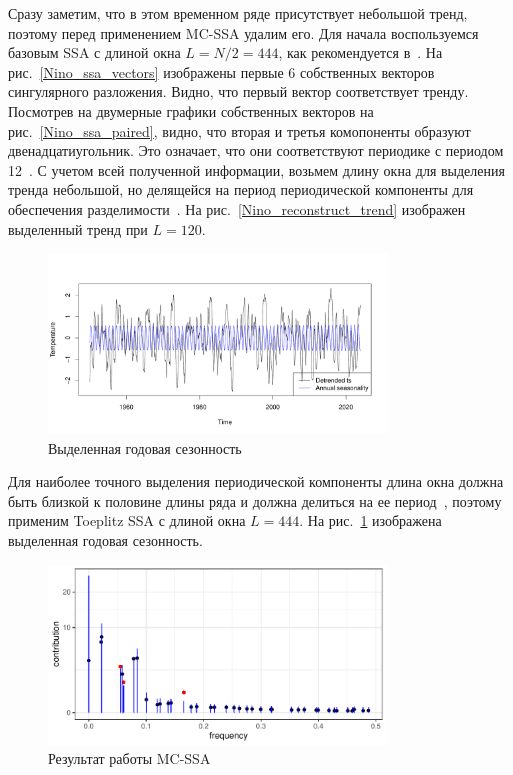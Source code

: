 \documentclass[specialist,
substylefile = spbu_report.rtx,
subf,href,colorlinks=true, 12pt]{disser}
\theoremstyle{definition}
\begin{document}
Сразу заметим, что в этом временном ряде присутствует небольшой тренд, поэтому перед применением MC-SSA удалим его. Для начала воспользуемся базовым SSA с длиной окна $L=N/2=444$, как рекомендуется в~\cite{ssa_an}. На рис.~\ref{Nino_ssa_vectors} изображены первые 6 собственных векторов сингулярного разложения. Видно, что первый вектор соответствует тренду. Посмотрев на двумерные графики собственных векторов на рис.~\ref{Nino_ssa_paired}, видно, что вторая и третья комопоненты образуют двенадцатиугольник. Это означает, что они соответствуют периодике с периодом 12~\cite{ssa_an}. С учетом всей полученной информации, возьмем длину окна для выделения тренда небольшой, но делящейся на период периодической компоненты для обеспечения разделимости~\cite{ssa_an}. На рис.~\ref{Nino_reconstruct_trend} изображен выделенный тренд при $L=120$.
\begin{figure}[h!]
	\centering
	\includegraphics[width=0.8\textwidth]{img/Nino_reconstruct_season.pdf}
	\caption{Выделенная годовая сезонность}
	\label{Nino_reconstruct_season}
\end{figure}
Для наиболее точного выделения периодической компоненты длина окна должна быть близкой к половине длины ряда и должна делиться на ее период~\cite{ssa_an}, поэтому применим Toeplitz SSA с длиной окна $L=444$. На рис.~\ref{Nino_reconstruct_season} изображена выделенная годовая сезонность.
\begin{figure}
	\centering
	\includegraphics[width=0.8\textwidth]{img/Nino_mcssa.pdf}
	\caption{Результат работы MC-SSA}
	\label{Nino_mcssa}
\end{figure}
\end{document}
